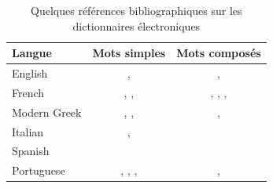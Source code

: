 \bigskip
\begin{table}[!h]
\begin{center}
\begin{tabular}{|l|c|c|}
\hline
\textbf{Langue} & \textbf{Mots simples} & \textbf{Mots composés} \\
\hline
English & \cite{klarsfeld}, \cite{monceaux-1995} & \cite{delac-anglais},
\cite{these-Savary} \\
\hline
French & \cite{formes-ambigues}, \cite{dicos-francais}, \cite{jacques-1995} & \cite{dicos-francais},
\cite{Gross96},
\cite{max-1993},
\cite{syntaxe-de-ladverbe} \\
\hline
Modern Greek & \cite{modern-greek}, \cite{matthieu-anastasia}, \cite{these-tita} & \cite{tita-2002},
\cite{anastasia-2002} \\
\hline
Italian & \cite{delaf-italien}, \cite{delaf-italien-book} & \cite{composes-italien} \\
\hline
Spanish & \cite{blanco-2000} & \cite{blanco-1997} \\
\hline
Portuguese & \cite{eleuterio1995}, \cite{ranchhod1996b}, \cite{ranchhodd1998},
\cite{muniz2005} & \cite{ranchhod1991}, \cite{ranchhodd1998} \\
\hline
\end{tabular}
\caption{Quelques références bibliographiques sur les dictionnaires électroniques\label{ref-dicos}}
\end{center}
\end{table}

